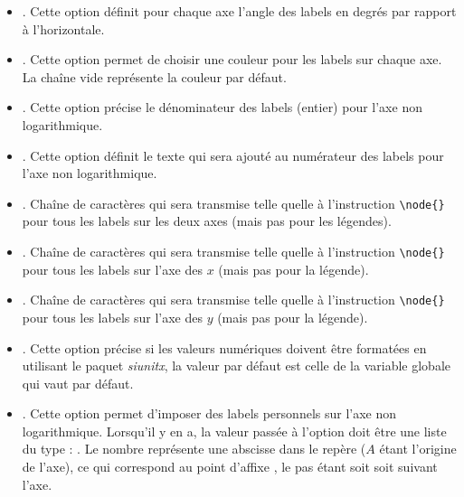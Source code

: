 \begin{itemize}
\begin{itemize}
        \item {}. Cette option définit pour chaque axe l'angle des labels en degrés par rapport à l'horizontale.
        
        \item {}. Cette option permet de choisir une couleur pour les labels sur chaque axe. La chaîne vide représente la couleur par défaut.
        
        \item {}. Cette option précise le dénominateur des labels (entier) pour l'axe non logarithmique. 
        
        \item {}. Cette option définit le texte qui sera ajouté au numérateur des labels pour l'axe non logarithmique.
             
        \item {}. Chaîne de caractères qui sera transmise telle quelle à l'instruction \verb|\node{}| pour tous les labels sur les deux axes (mais pas pour les légendes).
        
        \item {}. Chaîne de caractères qui sera transmise telle quelle à l'instruction \verb|\node{}| pour tous les labels sur l'axe des $x$ (mais pas pour la légende).
        
         \item {}. Chaîne de caractères qui sera transmise telle quelle à l'instruction \verb|\node{}| pour tous les labels sur l'axe des $y$ (mais pas pour la légende).
        
        \item {}. Cette option précise si les valeurs numériques doivent être formatées en utilisant le paquet \emph{siunitx}, la valeur par défaut est celle de la variable globale  qui vaut \false par défaut.
        
        \item {}. Cette option permet d'imposer des labels personnels sur l'axe non logarithmique. Lorsqu'il y en a, la valeur passée à l'option doit être une liste du type : . Le nombre  représente une abscisse dans le repère  ($A$ étant l'origine de l'axe), ce qui correspond au point d'affixe , le pas étant soit  soit  suivant l'axe.
        

\end{itemize}
\end{itemize}
